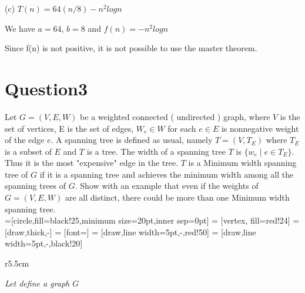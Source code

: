 \documentclass[12]{article}
\begin{document}
(c) $T(n) = 64(n/8) - n^2logn$


We have $a = 64 $, $ b = 8 $ and $f(n) = - n^2logn$

Since f(n) is not positive, it is not possible to use the master theorem.


\section{Question3} 

Let $G = (V, E, W )$ be a weighted connected ( undirected ) graph, where $V$ is the set of vertices, E is the set of edges, $W_e \in W $ for each $e \in E$ is nonnegative weight of the edge $e$. A spanning tree is defined as usual, namely $T = (V, T_E)$ where $T_E$ is a subset of $E$ and $T$ is a tree. The width of a spanning tree $T$ is $\lbrace w_e \mid e \in T_E \rbrace$. Thus it is the most "expensive" edge in the tree. $T$ is a Minimum width spanning tree of $G$ if it is a spanning tree and achieves the minimum width among all the spanning trees of $G$. Show with an example that even if the weights of $G = (V,E,W)$ are all distinct, there could be more than one Minimum width spanning tree. \\


=[circle,fill=black!25,minimum size=20pt,inner sep=0pt]
 = [vertex, fill=red!24]
 = [draw,thick,-]
 = [font=\small]
 = [draw,line width=5pt,-,red!50]
 = [draw,line width=5pt,-,black!20]

\begin{wrapfigure}{r}{5.5cm}

	\textsl{Let define a graph $G$ }
	\centering
{}
\end{wrapfigure} 
\end{document}
